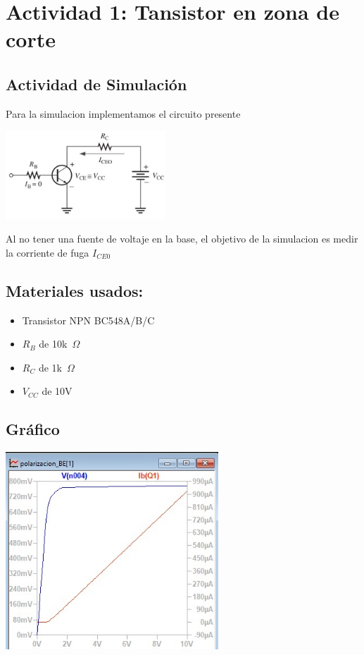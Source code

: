 \section{Actividad 1: Tansistor en zona de corte}

\subsection{Actividad de Simulación}

Para la simulacion implementamos el circuito presente

\includegraphics[width=6cm]{./imagenes/Circuito1.png}

Al no tener una fuente de voltaje en la base, el objetivo de la simulacion es medir la corriente de fuga $I_{CE0}$

\subsection{Materiales usados:}

\begin{itemize}
    \item Transistor NPN BC548A/B/C
    \item $R_B$ de 10k~$\Omega$
    \item $R_C$ de 1k~$\Omega$
    \item $V_{CC}$ de 10V
\end{itemize}

\subsection{Gráfico}

\includegraphics[width=8cm]{./imagenes/Grafico1.jpg}

